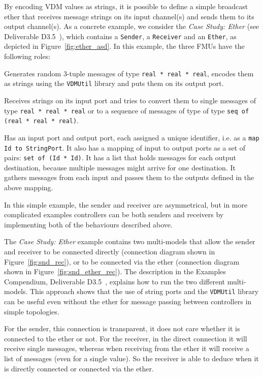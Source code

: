 By encoding VDM values as strings, it is possible to define a simple broadcast ether that receives message strings on its input channel(s) and sends them to its output channel(s). As a concrete example, we consider the \emph{Case Study: Ether} (see Deliverable D3.5~\cite{INTOCPSD3.5}), which contains a \texttt{Sender}, a \texttt{Receiver} and an \texttt{Ether}, as depicted in Figure~\ref{fig:ether_asd}. In this example, the three FMUs have the following roles:

\begin{description}[noitemsep]
  \item[Sender] Generates random 3-tuple messages of type \texttt{real * real * real}, encodes them as strings using the \texttt{VDMUtil} library and puts them on its output port.
  \item[Receiver] Receives strings on its input port and tries to convert them to single messages of type \texttt{real * real * real} or to a sequence of messages of type of type \texttt{seq of (real * real * real)}.
  \item[Ether] Has an input port and output port, each assigned a unique identifier, i.e. as a \texttt{map Id to StringPort}. It also has a mapping of input to output ports as a set of pairs: \texttt{set of (Id * Id)}. It has a list that holds messages for each output destination, because multiple messages might arrive for one destination. It gathers messages from each input and passes them to the outputs defined in the above mapping.
\end{description}

In this simple example, the sender and receiver are asymmetrical, but in more complicated examples controllers can be both senders and receivers by implementing both of the behaviours described above.

The \emph{Case Study: Ether} example contains two multi-models that allow the sender and receiver to be connected directly (connection diagram shown in Figure~\ref{fig:snd_rec}), or to be connected via the ether (connection diagram shown in Figure~\ref{fig:snd_ether_rec}). The description in the Examples Compendium, Deliverable D3.5~\cite{INTOCPSD3.5}, explains how to run the two different multi-models. This approach shows that the use of string ports and the \texttt{VDMUtil} library can be useful even without the ether for message passing between controllers in simple topologies.

For the sender, this connection is transparent, it does not care whether it is connected to the ether or not. For the receiver, in the direct connection it will receive single messages, whereas when receiving from the ether it will receive a list of messages (even for a single value). So the receiver is able to deduce when it is directly connected or connected via the ether. %



